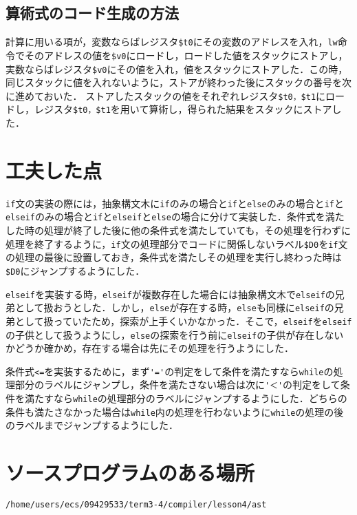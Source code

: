 \documentclass{jarticle}[11pt]
\begin{document}
\subsection{算術式のコード生成の方法}
計算に用いる項が，変数ならばレジスタ\verb|$t0|にその変数のアドレスを入れ，\verb|lw|命令でそのアドレスの値を\verb|$v0|にロードし，ロードした値をスタックにストアし，実数ならばレジスタ\verb|$v0|にその値を入れ，値をスタックにストアした．この時，同じスタックに値を入れないように，ストアが終わった後にスタックの番号を次に進めておいた．
ストアしたスタックの値をそれぞれレジスタ\verb|$t0，$t1|にロードし，レジスタ\verb|$t0，$t1|を用いて算術し，得られた結果をスタックにストアした．

\section{工夫した点}
\verb|if|文の実装の際には，抽象構文木に\verb|if|のみの場合と\verb|if|と\verb|else|のみの場合と\verb|if|と\verb|elseif|のみの場合と\verb|if|と\verb|elseif|と\verb|else|の場合に分けて実装した．条件式を満たした時の処理が終了した後に他の条件式を満たしていても，その処理を行わずに処理を終了するように，\verb|if|文の処理部分でコードに関係しないラベル\verb|$D0|を\verb|if|文の処理の最後に設置しておき，条件式を満たしその処理を実行し終わった時は\verb|$D0|にジャンプするようにした．

\verb|elseif|を実装する時，\verb|elseif|が複数存在した場合には抽象構文木で\verb|elseif|の兄弟として扱おうとした．しかし，\verb|else|が存在する時，\verb|else|も同様に\verb|elseif|の兄弟として扱っていたため，探索が上手くいかなかった．そこで，\verb|elseif|を\verb|elseif|の子供として扱うようにし，\verb|else|の探索を行う前に\verb|elseif|の子供が存在しないかどうか確かめ，存在する場合は先にその処理を行うようにした．

条件式\verb|<=|を実装するために，まず\verb|'='|の判定をして条件を満たすなら\verb|while|の処理部分のラベルにジャンプし，条件を満たさない場合は次に\verb|'＜'|の判定をして条件を満たすなら\verb|while|の処理部分のラベルにジャンプするようにした．どちらの条件も満たさなかった場合は\verb|while|内の処理を行わないように\verb|while|の処理の後のラベルまでジャンプするようにした．

\section{ソースプログラムのある場所}
\begin{verbatim}
/home/users/ecs/09429533/term3-4/compiler/lesson4/ast
\end{verbatim}
\end{document}
